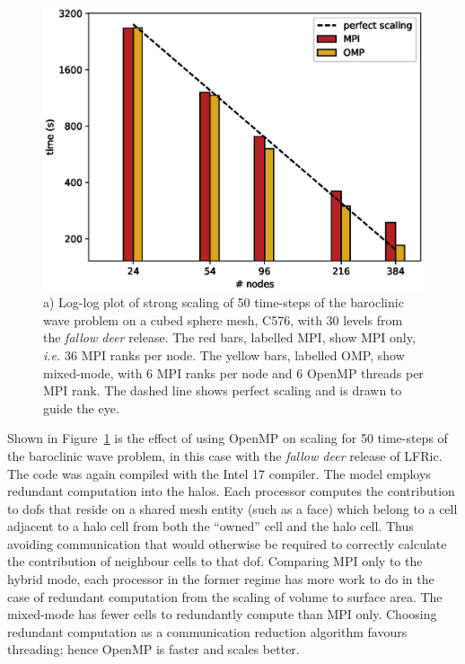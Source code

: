 \documentclass[review,times]{elsarticle}
\begin{document}
\begin{figure}
  \begin{center}
\includegraphics[width=0.75\linewidth]{Fig8a_strong_scale.eps}%
    \caption{\label{fig:OMP_scale}a) Log-log plot of strong scaling of
      50 time-steps of the baroclinic wave problem on a cubed sphere
      mesh, C576, with 30 levels from the {\em fallow deer}
      release. The red bars, labelled MPI, show MPI only, {\em i.e.}
      36 MPI ranks per node. The yellow bars, labelled OMP, show
      mixed-mode, with 6 MPI ranks per node and 6 OpenMP threads per
      MPI rank. The dashed line shows perfect scaling and is drawn to
      guide the eye.} 
  \end{center}
\end{figure}

Shown in Figure~\ref{fig:OMP_scale} is the effect of using OpenMP on 
scaling for 50 time-steps of the baroclinic wave problem, in this case
with the {\em fallow deer} release of LFRic. The code was
again compiled with the Intel 17 compiler. The model employs redundant
computation into the halos. Each processor computes the contribution
to dofs that reside on a shared mesh
entity (such as a face) which belong to a cell adjacent to a halo cell
from both the ``owned'' cell and the halo cell. Thus avoiding
communication that would otherwise be required to correctly calculate
the contribution of neighbour cells to that dof. Comparing MPI only to
the hybrid mode, each processor in the former regime has more work to
do in the case of redundant computation from the scaling of volume to
surface area. The mixed-mode has fewer cells to redundantly compute than
MPI only. Choosing redundant computation as a communication reduction
algorithm favours threading; hence OpenMP is faster and scales better.
 
\end{document}
